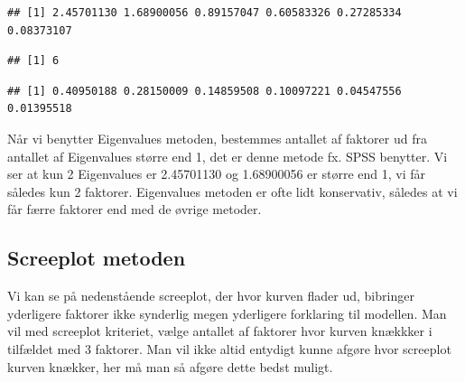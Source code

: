 \documentclass[]{book}
\newenvironment{Shaded}{\begin{snugshade}}{\end{snugshade}}
\newcommand{\KeywordTok}[1]{\textcolor[rgb]{0.13,0.29,0.53}{\textbf{#1}}}
\newcommand{\NormalTok}[1]{#1}
\newcommand{\OperatorTok}[1]{\textcolor[rgb]{0.81,0.36,0.00}{\textbf{#1}}}
\newcommand{\StringTok}[1]{\textcolor[rgb]{0.31,0.60,0.02}{#1}}
\begin{document}
\begin{Shaded}
\end{Shaded}

\begin{verbatim}
## [1] 2.45701130 1.68900056 0.89157047 0.60583326 0.27285334 0.08373107
\end{verbatim}

\begin{Shaded}
\end{Shaded}

\begin{verbatim}
## [1] 6
\end{verbatim}

\begin{Shaded}
\end{Shaded}

\begin{verbatim}
## [1] 0.40950188 0.28150009 0.14859508 0.10097221 0.04547556 0.01395518
\end{verbatim}

Når vi benytter Eigenvalues metoden, bestemmes antallet af faktorer ud fra antallet af Eigenvalues større end 1, det er denne metode fx. SPSS benytter. Vi ser at kun 2 Eigenvalues er 2.45701130 og 1.68900056 er større end 1, vi får således kun 2 faktorer. Eigenvalues metoden er ofte lidt konservativ, således at vi får færre faktorer end med de øvrige metoder.

\hypertarget{screeplot-metoden}{%
\subsection{Screeplot metoden}\label{screeplot-metoden}}

Vi kan se på nedenstående screeplot, der hvor kurven flader ud, bibringer yderligere faktorer ikke synderlig megen yderligere forklaring til modellen. Man vil med screeplot kriteriet, vælge antallet af faktorer hvor kurven knækkker i tilfældet med 3 faktorer. Man vil ikke altid entydigt kunne afgøre hvor screeplot kurven knækker, her må man så afgøre dette bedst muligt.
\end{document}
